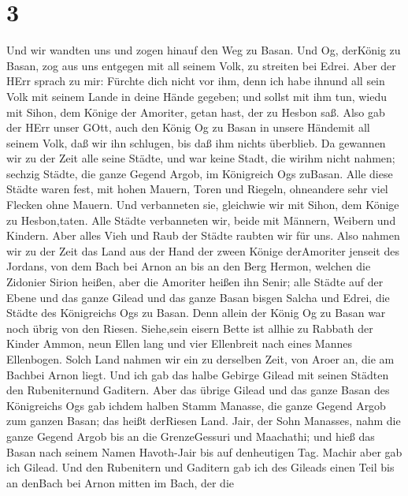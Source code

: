 \hypertarget{section-2}{%
\section{3}\label{section-2}}

 Und wir wandten uns und zogen hinauf den Weg zu Basan. Und
Og, derKönig zu Basan, zog aus uns entgegen mit all seinem Volk, zu
streiten bei Edrei.  Aber der HErr sprach zu mir: Fürchte
dich nicht vor ihm, denn ich habe ihnund all sein Volk mit seinem Lande
in deine Hände gegeben; und sollst mit ihm tun, wiedu mit Sihon, dem
Könige der Amoriter, getan hast, der zu Hesbon saß.  Also
gab der HErr unser GOtt, auch den König Og zu Basan in unsere Händemit
all seinem Volk, daß wir ihn schlugen, bis daß ihm nichts überblieb.
 Da gewannen wir zu der Zeit alle seine Städte, und war
keine Stadt, die wirihm nicht nahmen; sechzig Städte, die ganze Gegend
Argob, im Königreich Ogs zuBasan.  Alle diese Städte waren
fest, mit hohen Mauern, Toren und Riegeln, ohneandere sehr viel Flecken
ohne Mauern.  Und verbanneten sie, gleichwie wir mit Sihon,
dem Könige zu Hesbon,taten. Alle Städte verbanneten wir, beide mit
Männern, Weibern und Kindern.  Aber alles Vieh und Raub der
Städte raubten wir für uns.  Also nahmen wir zu der Zeit das
Land aus der Hand der zween Könige derAmoriter jenseit des Jordans, von
dem Bach bei Arnon an bis an den Berg Hermon,  welchen die
Zidonier Sirion heißen, aber die Amoriter heißen ihn Senir;
 alle Städte auf der Ebene und das ganze Gilead und das
ganze Basan bisgen Salcha und Edrei, die Städte des Königreichs Ogs zu
Basan.  Denn allein der König Og zu Basan war noch übrig
von den Riesen. Siehe,sein eisern Bette ist allhie zu Rabbath der Kinder
Ammon, neun Ellen lang und vier Ellenbreit nach eines Mannes Ellenbogen.
 Solch Land nahmen wir ein zu derselben Zeit, von Aroer an,
die am Bachbei Arnon liegt. Und ich gab das halbe Gebirge Gilead mit
seinen Städten den Rubeniternund Gaditern.  Aber das übrige
Gilead und das ganze Basan des Königreichs Ogs gab ichdem halben Stamm
Manasse, die ganze Gegend Argob zum ganzen Basan; das heißt derRiesen
Land.  Jair, der Sohn Manasses, nahm die ganze Gegend Argob
bis an die GrenzeGessuri und Maachathi; und hieß das Basan nach seinem
Namen Havoth-Jair bis auf denheutigen Tag.  Machir aber gab
ich Gilead.  Und den Rubenitern und Gaditern gab ich des
Gileads einen Teil bis an denBach bei Arnon mitten im Bach, der die
